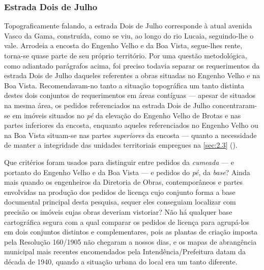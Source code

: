 \subsubsection{Estrada Dois de Julho}


Topograficamente falando, a estrada Dois de Julho corresponde à atual avenida Vasco da Gama, construída, como se viu, ao longo do rio Lucaia, seguindo-lhe o vale. Arrodeia a encosta do Engenho Velho e da Boa Vista, segue-lhes rente, torna-se quase parte de seu próprio território.  Por uma questão metodológica, como adiantado parágrafos acima, foi preciso todavia separar os requerimentos da estrada Dois de Julho daqueles referentes a obras situadas no Engenho Velho e na Boa Vista. Recomendavam-no tanto a situação topográfica um tanto distinta destes dois conjuntos de requerimentos em áreas contíguas --- apesar de situados na mesma área, os pedidos referenciados na estrada Dois de Julho concentraram-se em imóveis situados no \textit{pé} da elevação do Engenho Velho de Brotas e nas partes inferiores da encosta, enquanto aqueles referenciados no Engenho Velho ou na Boa Vista situam-se nas partes \textit{superiores} da encosta --- quanto a necessidade de manter a integridade das unidades territoriais empregues na \autoref{sec:2.3} (\pageref{sec:2.3}).

Que critérios foram usados para distinguir entre pedidos da \textit{cumeada} --- e portanto do Engenho Velho e da Boa Vista --- e pedidos do \textit{pé}, da \textit{base}? Ainda mais quando os engenheiros da Diretoria de Obras, contemporâneos e partes envolvidas na produção dos pedidos de licença cujo conjunto forma a base documental principal desta pesquisa, sequer eles conseguiam localizar com precisão os imóveis cujas obras deveriam vistoriar? Não há qualquer base cartográfica segura com a qual comparar os pedidos de licença para agrupá-los em dois conjuntos distintos e complementares, pois as plantas de criação imposta pela Resolução 160/1905 não chegaram a nossos dias, e os mapas de abrangência municipal mais recentes encomendados pela Intendência/Prefeitura datam da década de 1940, quando a situação urbana do local era um tanto diferente. 


